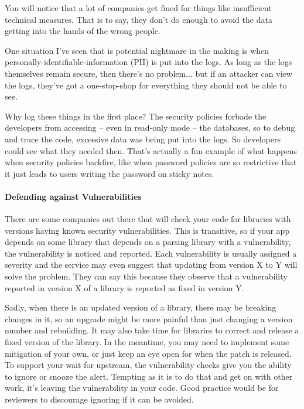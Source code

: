 \documentclass[a4paper]{report}
\begin{document}
You will notice that a lot of companies get fined for things like insufficient technical measures. That is to say, they don't do enough to avoid the data getting into the hands of the wrong people.

One situation I've seen that is potential nightmare in the making is when personally-identifiable-information (PII) is put into the logs. As long as the logs themselves remain secure, then there's no problem... but if an attacker can view the logs, they've got a one-stop-shop for everything they should not be able to see.

Why log these things in the first place?  The security policies forbade the developers from accessing -- even in read-only mode -- the databases, so to debug and trace the code, excessive data was being put into the logs. So developers could see what they needed then. That's actually a fun example of what happens when security policies backfire, like when password policies are so restrictive that it just leads to users writing the password on sticky notes.


\paragraph{Defending against Vulnerabilities}
There are some companies out there that will check your code for libraries with versions having known security vulnerabilities. This is transitive, so if your app depends on some library that depends on a parsing library with a vulnerability, the vulnerability is noticed and reported. Each vulnerability is usually assigned a severity and the service may even suggest that updating from version X to Y will solve the problem. They can say this because they observe that a vulnerability reported in version X of a library is reported as fixed in version Y. 

Sadly, when there is an updated version of a library, there may be breaking changes in it, so an upgrade might be more painful than just changing a version number and rebuilding. It may also take time for libraries to correct and release a fixed version of the library. In the meantime, you may need to implement some mitigation of your own, or just keep an eye open for when the patch is released. To support your wait for upstream, the vulnerability checks give you the ability to ignore or snooze the alert. Tempting as it is to do that and get on with other work, it's leaving the vulnerability in your code. Good practice would be for reviewers to discourage ignoring if it can be avoided.
\end{document}
